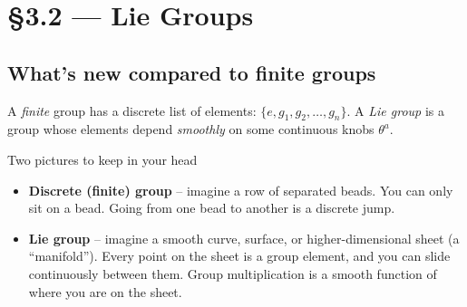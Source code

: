 \documentclass[11pt]{article}
\begin{document}
\section{\S3.2 --- Lie Groups}

\subsection*{What's new compared to finite groups}

A \emph{finite} group has a discrete list of elements: $\{e, g_1, g_2,
\ldots, g_n\}$. A \emph{Lie group} is a group whose elements depend
\emph{smoothly} on some continuous knobs $\theta^a$.

\begin{intuitionbox}{Two pictures to keep in your head}
\begin{itemize}[leftmargin=1.5em, itemsep=4pt]
  \item \textbf{Discrete (finite) group} -- imagine a row of separated
    beads. You can only sit on a bead.  Going from one bead to another
    is a discrete jump.
  \item \textbf{Lie group} -- imagine a smooth curve, surface, or
    higher-dimensional sheet (a ``manifold''). Every point on the sheet
    is a group element, and you can slide continuously between them.
    Group multiplication is a smooth function of where you are on the
    sheet.
\end{itemize}
\end{intuitionbox}
\end{document}
